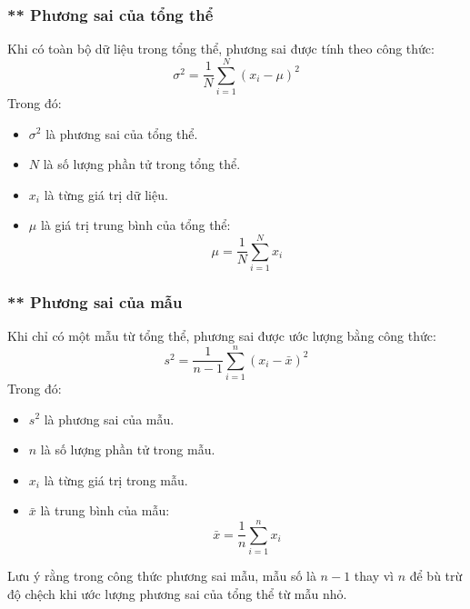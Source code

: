 \subsubsection{** Phương sai của tổng thể}
Khi có toàn bộ dữ liệu trong tổng thể, phương sai được tính theo công thức:
\begin{equation}
    \sigma^2 = \frac{1}{N} \sum_{i=1}^{N} (x_i - \mu)^2
\end{equation}
Trong đó:
\begin{itemize}
    \item $\sigma^2$ là phương sai của tổng thể.
    \item $N$ là số lượng phần tử trong tổng thể.
    \item $x_i$ là từng giá trị dữ liệu.
    \item $\mu$ là giá trị trung bình của tổng thể:
          \begin{equation}
              \mu = \frac{1}{N} \sum_{i=1}^{N} x_i
          \end{equation}
\end{itemize}

\subsubsection{** Phương sai của mẫu}
Khi chỉ có một mẫu từ tổng thể, phương sai được ước lượng bằng công thức:
\begin{equation}
    s^2 = \frac{1}{n-1} \sum_{i=1}^{n} (x_i - \bar{x})^2
\end{equation}
Trong đó:
\begin{itemize}
    \item $s^2$ là phương sai của mẫu.
    \item $n$ là số lượng phần tử trong mẫu.
    \item $x_i$ là từng giá trị trong mẫu.
    \item $\bar{x}$ là trung bình của mẫu:
          \begin{equation}
              \bar{x} = \frac{1}{n} \sum_{i=1}^{n} x_i
          \end{equation}
\end{itemize}
Lưu ý rằng trong công thức phương sai mẫu, mẫu số là $n-1$ thay vì $n$ để bù trừ độ chệch khi ước lượng phương sai của tổng thể từ mẫu nhỏ.

